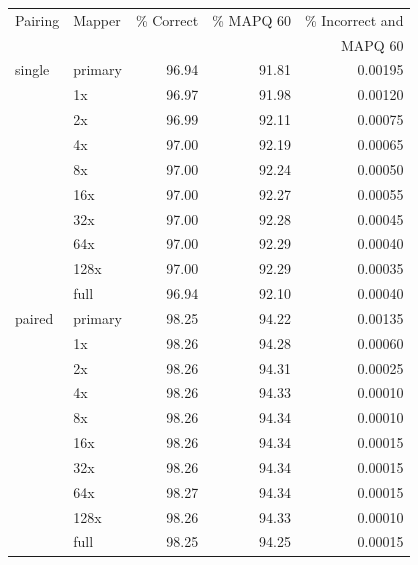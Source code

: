 \documentclass[11pt]{ucscthesis}
\begin{document}
\begin{table}[p]
    \centering
    \begin{tabular}{|l|l|r|r|r|}
    \hline
        Pairing & Mapper & \% Correct & \% MAPQ 60 & \% Incorrect and \\
               &         &            &            & MAPQ 60          \\
        \hline
        single  & primary   & 96.94     & 91.81     & 0.00195 \\
                & 1x        & 96.97     & 91.98     & 0.00120 \\
                & 2x        & 96.99     & 92.11     & 0.00075 \\
                & 4x        & 97.00     & 92.19     & 0.00065 \\
                & 8x        & 97.00     & 92.24     & 0.00050 \\
                & 16x       & 97.00     & 92.27     & 0.00055 \\
                & 32x       & 97.00     & 92.28     & 0.00045 \\
                & 64x       & 97.00     & 92.29     & 0.00040 \\
                & 128x      & 97.00     & 92.29     & 0.00035 \\
                & full      & 96.94     & 92.10     & 0.00040 \\

        \hline
        paired  & primary   & 98.25     & 94.22     & 0.00135 \\
                & 1x        & 98.26     & 94.28     & 0.00060 \\
                & 2x        & 98.26     & 94.31     & 0.00025 \\
                & 4x        & 98.26     & 94.33     & 0.00010 \\
                & 8x        & 98.26     & 94.34     & 0.00010 \\
                & 16x       & 98.26     & 94.34     & 0.00015 \\
                & 32x       & 98.26     & 94.34     & 0.00015 \\
                & 64x       & 98.27     & 94.34     & 0.00015 \\
                & 128x      & 98.26     & 94.33     & 0.00010 \\
                & full      & 98.25     & 94.25     & 0.00015 \\
                


\end{tabular}
\end{table}
\end{document}
